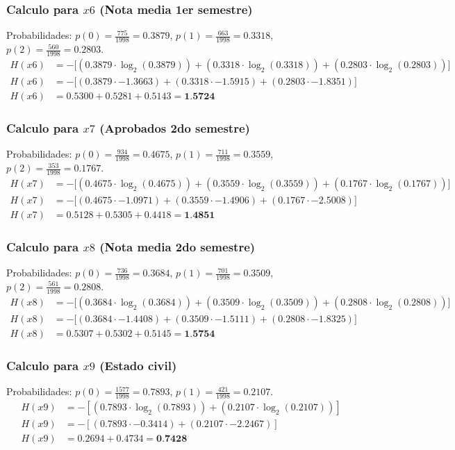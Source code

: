 \documentclass[12pt,a4paper]{article}
\begin{document}
\subsubsection{Calculo para $x6$ (Nota media 1er semestre)}
Probabilidades: $p(0) = \frac{775}{1998} = 0.3879$, $p(1) = \frac{663}{1998} = 0.3318$, $p(2) = \frac{560}{1998} = 0.2803$.
\begin{align*}
    H(x6) &= -\big[ (0.3879 \cdot \log_2(0.3879)) + (0.3318 \cdot \log_2(0.3318)) + (0.2803 \cdot \log_2(0.2803)) \big] \\
    H(x6) &= -\big[ (0.3879 \cdot -1.3663) + (0.3318 \cdot -1.5915) + (0.2803 \cdot -1.8351) \big] \\
    H(x6) &= 0.5300 + 0.5281 + 0.5143 = \textbf{1.5724}
\end{align*}

\subsubsection{Calculo para $x7$ (Aprobados 2do semestre)}
Probabilidades: $p(0) = \frac{934}{1998} = 0.4675$, $p(1) = \frac{711}{1998} = 0.3559$, $p(2) = \frac{353}{1998} = 0.1767$.
\begin{align*}
    H(x7) &= -\big[ (0.4675 \cdot \log_2(0.4675)) + (0.3559 \cdot \log_2(0.3559)) + (0.1767 \cdot \log_2(0.1767)) \big] \\
    H(x7) &= -\big[ (0.4675 \cdot -1.0971) + (0.3559 \cdot -1.4906) + (0.1767 \cdot -2.5008) \big] \\
    H(x7) &= 0.5128 + 0.5305 + 0.4418 = \textbf{1.4851}
\end{align*}

\subsubsection{Calculo para $x8$ (Nota media 2do semestre)}
Probabilidades: $p(0) = \frac{736}{1998} = 0.3684$, $p(1) = \frac{701}{1998} = 0.3509$, $p(2) = \frac{561}{1998} = 0.2808$.
\begin{align*}
    H(x8) &= -\big[ (0.3684 \cdot \log_2(0.3684)) + (0.3509 \cdot \log_2(0.3509)) + (0.2808 \cdot \log_2(0.2808)) \big] \\
    H(x8) &= -\big[ (0.3684 \cdot -1.4408) + (0.3509 \cdot -1.5111) + (0.2808 \cdot -1.8325) \big] \\
    H(x8) &= 0.5307 + 0.5302 + 0.5145 = \textbf{1.5754}
\end{align*}

\subsubsection{Calculo para $x9$ (Estado civil)}
Probabilidades: $p(0) = \frac{1577}{1998} = 0.7893$, $p(1) = \frac{421}{1998} = 0.2107$.
\begin{align*}
    H(x9) &= -\left[ (0.7893 \cdot \log_2(0.7893)) + (0.2107 \cdot \log_2(0.2107)) \right] \\
    H(x9) &= -\left[ (0.7893 \cdot -0.3414) + (0.2107 \cdot -2.2467) \right] \\
    H(x9) &= 0.2694 + 0.4734 = \textbf{0.7428}
\end{align*}
\end{document}
